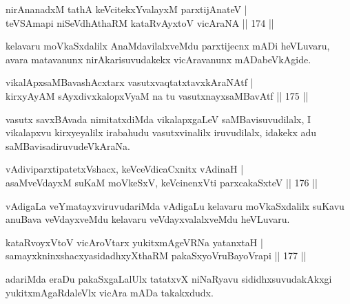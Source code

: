 \begin{shl}
nirAnanadxM tathA keVcitekxYvalayxM parxtijAnateV |\\
teVSAmapi niSeVdhAthaRM kataRvAyx\s toV vicAraNA \hfill || 174 ||
\end{shl}

\begin{artha}
kelavaru moVkaSxdalilx AnaMdavilalxveMdu parxtijecnx mADi heVLuvaru, avara matavanunx nirAkarisuvudakekx vicAravanunx mADabeVkAgide.
\end{artha}


\begin{shl}
vikalApxsaMBavashAcxtarx vasutxvaqtatxtavxkAraNAtf |\\
kirxyAyAM sAyxdivxkalopxV\s yaM na tu vasutxnayxsaMBavAtf \hfill || 175 ||
\end{shl}

\begin{artha}%
vasutx savxBAvada nimitatxdiMda vikalapxgaLeV saMBavisuvudilalx, I vikalapxvu kirxyeyalilx irabahudu vasutxvinalilx iruvudilalx, idakekx adu saMBavisadiruvudeVkAraNa.
\end{artha}


\begin{shl}
vAdiviparxtipatetxVshacx, keVceVdicaCxnitx vAdinaH |\\
asaMveVdayxM suKaM moVkeSxV, keVcinenxVti parxcakaSxteV \hfill || 176 ||
\end{shl}

\begin{artha}
vAdigaLa veYmatayxviruvudariMda vAdigaLu kelavaru moVkaSxdalilx suKavu anuBava veVdayxveMdu kelavaru veVdayxvalalxveMdu heVLuvaru.
\end{artha}

\begin{shl}
kataRvoyxV\s toV vicAroV\s tarx yukitxmAgeVRNa yatanxtaH |\\
samayxkninxshacxyasidadhxyXthaRM pakaSxyoVruBayoVrapi \hfill || 177 ||
\end{shl}

\begin{artha}
adariMda eraDu pakaSxgaLalUlx tatatxvX niNaRyavu sididhxsuvudakAkxgi yukitxmAgaRdaleVlx vicAra mADa takakxdudx.
\end{artha}

